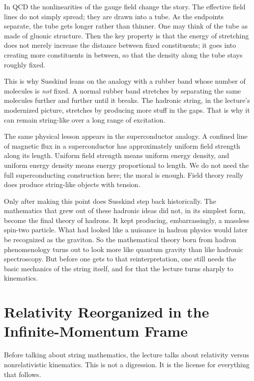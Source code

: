 In QCD the nonlinearities of the gauge field change the story. The effective field lines do not simply spread; they are drawn into a tube. As the endpoints separate, the tube gets longer rather than thinner. One may think of the tube as made of gluonic structure. Then the key property is that the energy of stretching does not merely increase the distance between fixed constituents; it goes into creating more constituents in between, so that the density along the tube stays roughly fixed.

This is why Susskind leans on the analogy with a rubber band whose number of molecules is \emph{not} fixed. A normal rubber band stretches by separating the same molecules further and further until it breaks. The hadronic string, in the lecture's modernized picture, stretches by producing more stuff in the gaps. That is why it can remain string-like over a long range of excitation.

The same physical lesson appears in the superconductor analogy. A confined line of magnetic flux in a superconductor has approximately uniform field strength along its length. Uniform field strength means uniform energy density, and uniform energy density means energy proportional to length. We do not need the full superconducting construction here; the moral is enough. Field theory really does produce string-like objects with tension.

Only after making this point does Susskind step back historically. The mathematics that grew out of these hadronic ideas did not, in its simplest form, become the final theory of hadrons. It kept producing, embarrassingly, a massless spin-two particle. What had looked like a nuisance in hadron physics would later be recognized as the graviton. So the mathematical theory born from hadron phenomenology turns out to look more like quantum gravity than like hadronic spectroscopy. But before one gets to that reinterpretation, one still needs the basic mechanics of the string itself, and for that the lecture turns sharply to kinematics.

\section{Relativity Reorganized in the Infinite-Momentum Frame}

Before talking about string mathematics, the lecture talks about relativity versus nonrelativistic kinematics. This is not a digression. It is the license for everything that follows.

